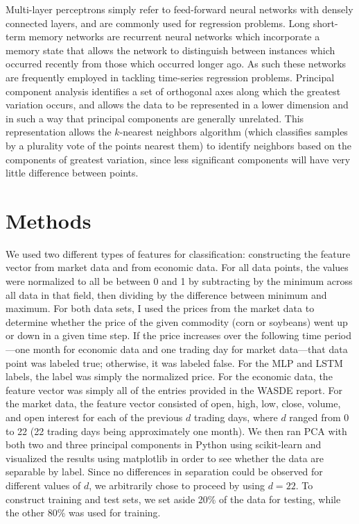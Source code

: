 \documentclass{article}
\begin{document}
Multi-layer perceptrons simply refer to feed-forward neural networks with densely connected layers, and are commonly used for regression problems.  
Long short-term memory networks are recurrent neural networks which incorporate a memory state that allows the network to distinguish between instances which occurred recently from those which occurred longer ago.  
As such these networks are frequently employed in tackling time-series regression problems.  
Principal component analysis identifies a set of orthogonal axes along which the greatest variation occurs, and allows the data to be represented in a lower dimension and in such a way that principal components are generally unrelated.  This representation allows the $k$-nearest neighbors algorithm (which classifies samples by a plurality vote of the points nearest them) to identify neighbors based on the components of greatest variation, since less significant components will have very little difference between points.




\section{Methods}
We used two different types of features for classification: constructing the feature vector from market data and from economic data. 
For all data points, the values were normalized to all be between 0 and 1 by subtracting by the minimum across all data in that field, then dividing by the difference between minimum and maximum.  
For both data sets, I used the prices from the market data to determine whether the price of the given commodity (corn or soybeans) went up or down in a given time step. 
If the price increases over the following time period---one month for economic data and one trading day for market data---that data point was labeled true; otherwise, it was labeled false.  
For the MLP and LSTM labels, the label was simply the normalized price.
For the economic data, the feature vector was simply all of the entries provided in the WASDE report.
For the market data, the feature vector consisted of open, high, low, close, volume, and open interest for each of the previous $d$ trading days, where $d$ ranged from 0 to 22 (22 trading days being approximately one month).
We then ran PCA with both two and three principal components in Python using scikit-learn and visualized the results using matplotlib in order to see whether the data are separable by label.  Since no differences in separation could be observed for different values of $d$, we arbitrarily chose to proceed by using $d=22$.
To construct training and test sets, we set aside 20\% of the data for testing, while the other 80\% was used for training.
\end{document}
